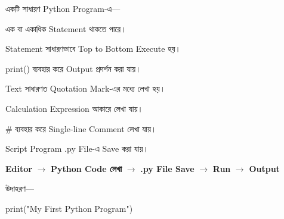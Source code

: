 

একটি সাধারণ Python Program-এ—

\begin{compacttwocolpoints}

\item এক বা একাধিক Statement থাকতে পারে।

\item Statement সাধারণভাবে Top to Bottom Execute হয়।

\item
\textenglish{\ttfamily print()}
ব্যবহার করে Output প্রদর্শন করা যায়।

\item Text সাধারণত Quotation Mark-এর মধ্যে লেখা হয়।

\item Calculation Expression আকারে লেখা যায়।

\item
\textenglish{\ttfamily \#}
ব্যবহার করে Single-line Comment লেখা যায়।

\item Script Program
\textenglish{\ttfamily .py}
File-এ Save করা যায়।

\end{compacttwocolpoints}



\begin{center}

\textbf{Editor}
\(\longrightarrow\)
\textbf{Python Code লেখা}
\(\longrightarrow\)
\textbf{\textenglish{\ttfamily .py} File Save}
\(\longrightarrow\)
\textbf{Run}
\(\longrightarrow\)
\textbf{Output}

\end{center}

উদাহরণ—

\begin{codebox}

\begin{english}
\ttfamily
print("My First Python Program")
\end{english}

\end{codebox}

